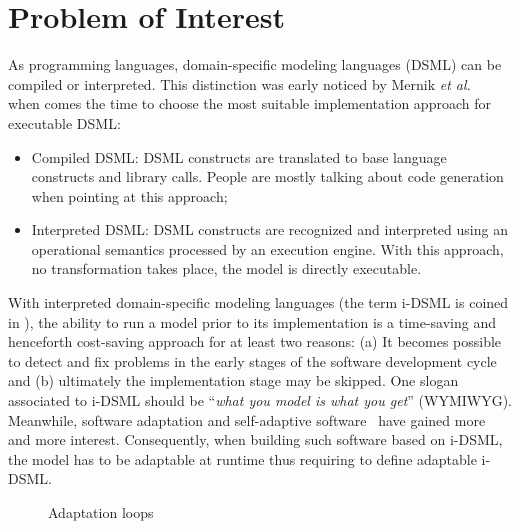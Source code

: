 \documentclass[english, 10pt]{llncs}
\begin{document}
\section{Problem of Interest}

As programming languages, domain-specific modeling languages (DSML) can be
compiled or interpreted. This distinction was early noticed by Mernik
\emph{et al.}~\cite{Mernik:2005} when comes the time to choose the most
suitable implementation approach for executable DSML:
\begin{itemize}
\item Compiled DSML: DSML constructs are translated to base language
  constructs and library calls. People are mostly talking about code
  generation when pointing at this approach;
\item Interpreted DSML: DSML constructs are recognized and interpreted
  using an operational semantics processed by an execution
  engine. With this approach, no transformation takes place, the model
  is directly executable.
\end{itemize}

With interpreted domain-specific modeling languages (the term i-DSML
is coined in \cite{clarke-book-iDSML13}), the ability to run a model
prior to its implementation is a time-saving and henceforth
cost-saving approach for at least two reasons: (a) It becomes possible
to detect and fix problems in the early stages of the software
development cycle and (b) ultimately the implementation stage may be
skipped. One slogan associated to i-DSML should be ``\textsl{what you
  model is what you get}'' (WYMIWYG). Meanwhile, software adaptation
and self-adaptive software~\cite{salehie09} have gained more and more
interest. Consequently, when building such software based on i-DSML,
the model has to be adaptable at runtime thus requiring to define
adaptable i-DSML.

\begin{figure}[htbp]
\begin{center}
\caption{Adaptation loops}
\label{img_loops}
\end{center}
\end{figure}
\end{document}
